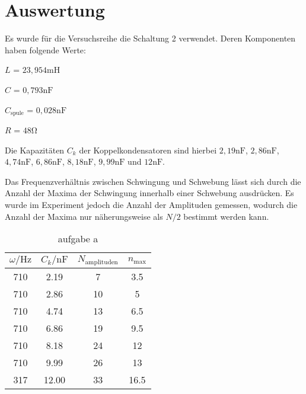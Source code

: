 \section{Auswertung}
\label{sec:Auswertung}

Es wurde für die Versuchsreihe die Schaltung 2 verwendet. Deren Komponenten haben folgende Werte:

$L$ = $23,954 \si{\milli\henry}$

$C$ = $0,793 \si{\nano\farad}$

$C_\text{spule}$ = $0,028 \si{\nano\farad}$

$R$ = $48 \si{\ohm}$

Die Kapazitäten $C_k$ der Koppelkondensatoren sind hierbei $2,19 \si{\nano\farad}$, $2,86 \si{\nano\farad}$,
$4,74 \si{\nano\farad}$, $6,86 \si{\nano\farad}$, $8,18 \si{\nano\farad}$, $9,99 \si{\nano\farad}$ und
$12 \si{\nano\farad}$.


Das Frequenzverhältnis zwischen Schwingung und Schwebung lässt sich durch die Anzahl der Maxima der Schwingung innerhalb
einer Schwebung ausdrücken. Es wurde im Experiment jedoch die Anzahl der Amplituden gemessen, wodurch die Anzahl der 
Maxima nur näherungsweise als $N/2$ bestimmt werden kann.  

\begin{table}
    \centering
    \caption{aufgabe a}
    \label{tab:a}
    \begin{tabular}{c c c c}
        \toprule
        {$\omega / \si{\hertz}$} & {$C_k / \si{\nano\farad}$} & {$N_\text{amplituden}$} & $n_\text{max}$ \\
        \midrule
        710 &  2.19 &  7 &  3.5 \\  
        710 &  2.86 & 10 &  5   \\
        710 &  4.74 & 13 &  6.5 \\
        710 &  6.86 & 19 &  9.5 \\
        710 &  8.18 & 24 & 12   \\
        710 &  9.99 & 26 & 13   \\
        317 & 12.00 & 33 & 16.5 \\
        \bottomrule
    \end{tabular}
\end{table}


